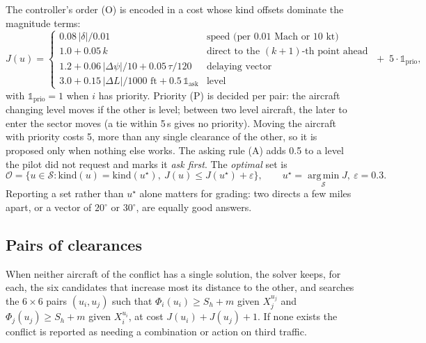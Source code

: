 \documentclass[11pt,a4paper]{article}
\newcommand{\argmin}{\operatorname*{arg\,min}}
\newcommand{\Sh}{S_h}
\begin{document}
The controller's order (O) is encoded in a cost whose kind offsets dominate the magnitude terms:
\begin{equation}
J(u) = \begin{cases}
0.08\,|\delta|/0.01 & \text{speed (per 0.01 Mach or 10 kt)}\\
1.0 + 0.05\,k & \text{direct to the $(k{+}1)$-th point ahead}\\
1.2 + 0.06\,|\Delta\psi|/10 + 0.05\,\tau/120 & \text{delaying vector}\\
3.0 + 0.15\,|\Delta L|/1000\text{ ft} + 0.5\,\mathbb 1_{\mathrm{ask}} & \text{level}
\end{cases}
\;+\; 5\cdot\mathbb 1_{\mathrm{prio}} ,
\end{equation}
with $\mathbb 1_{\mathrm{prio}}=1$ when $i$ has priority. Priority (P) is decided per pair: the aircraft changing level moves if the other is level; between two level
aircraft, the later to enter the sector moves (a tie within 5\,s gives no priority). Moving the aircraft with
priority costs 5, more than any single clearance of the other, so it is proposed only when nothing else works. The
asking rule (A) adds 0.5 to a level the pilot did not request and marks it \emph{ask first}. The \emph{optimal} set
is
\begin{equation}
\mathcal O = \{u\in\mathcal S : \mathrm{kind}(u)=\mathrm{kind}(u^\star),\ J(u)\le J(u^\star)+\varepsilon\},
\qquad u^\star=\argmin_{\mathcal S}J,\ \varepsilon = 0.3 .
\end{equation}
Reporting a set rather than $u^\star$ alone matters for grading: two directs a few miles apart, or a vector of
$20^\circ$ or $30^\circ$, are equally good answers.

\subsection{Pairs of clearances}

When neither aircraft of the conflict has a single solution, the solver keeps, for each, the six candidates that
increase most its distance to the other, and searches the $6\times6$ pairs $(u_i,u_j)$ such that
$\Phi_i(u_i)\ge \Sh+m$ given $X_j^{u_j}$ and $\Phi_j(u_j)\ge \Sh+m$ given $X_i^{u_i}$, at cost
$J(u_i)+J(u_j)+1$. If none exists the conflict is reported as needing a combination or action on third traffic.
\end{document}
